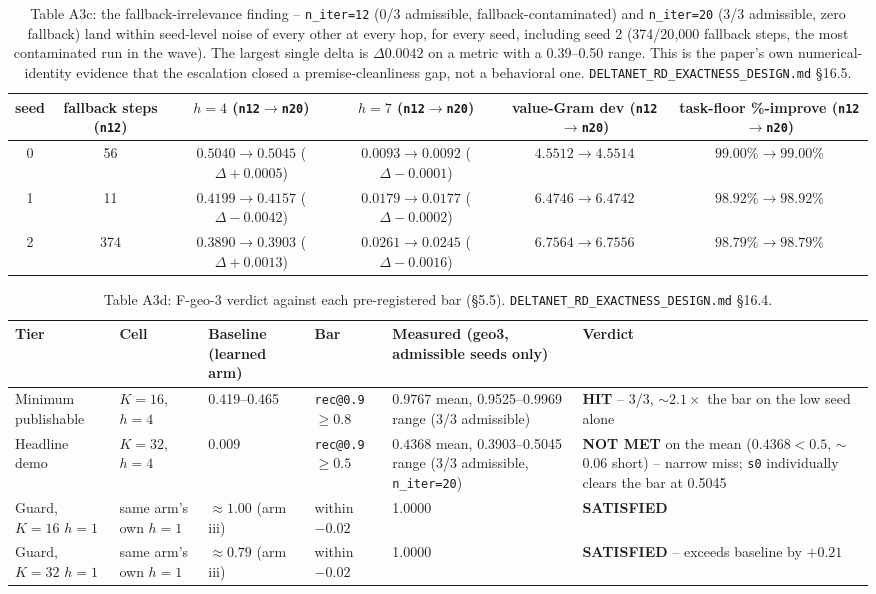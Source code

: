 \begin{table}[htbp]
\centering
\small
\begin{tabular}{cccccc}
\toprule
seed & fallback steps (\texttt{n12}) & $h{=}4$ (\texttt{n12}$\to$\texttt{n20}) & $h{=}7$ (\texttt{n12}$\to$\texttt{n20}) & value-Gram dev (\texttt{n12}$\to$\texttt{n20}) & task-floor \%-improve (\texttt{n12}$\to$\texttt{n20}) \\
\midrule
0 & 56  & $0.5040\to0.5045$ ($\Delta{+}0.0005$) & $0.0093\to0.0092$ ($\Delta{-}0.0001$) & $4.5512\to4.5514$ & $99.00\%\to99.00\%$ \\
1 & 11  & $0.4199\to0.4157$ ($\Delta{-}0.0042$) & $0.0179\to0.0177$ ($\Delta{-}0.0002$) & $6.4746\to6.4742$ & $98.92\%\to98.92\%$ \\
2 & 374 & $0.3890\to0.3903$ ($\Delta{+}0.0013$) & $0.0261\to0.0245$ ($\Delta{-}0.0016$) & $6.7564\to6.7556$ & $98.79\%\to98.79\%$ \\
\bottomrule
\end{tabular}
\caption{Table A3c: the fallback-irrelevance finding -- \texttt{n\_iter=12}
(0/3 admissible, fallback-contaminated) and \texttt{n\_iter=20} (3/3
admissible, zero fallback) land within seed-level noise of every other at
every hop, for every seed, including seed 2 (374/20{,}000 fallback steps,
the most contaminated run in the wave). The largest single delta is
$\Delta 0.0042$ on a metric with a 0.39--0.50 range. This is the paper's
own numerical-identity evidence that the escalation closed a
premise-cleanliness gap, not a behavioral one.
\texttt{DELTANET\_RD\_EXACTNESS\_DESIGN.md} \S16.5.}
\end{table}

\begin{table}[htbp]
\centering
\small
\begin{tabular}{p{2.6cm}p{2.0cm}p{1.6cm}p{1.6cm}p{3.6cm}p{3.6cm}}
\toprule
Tier & Cell & Baseline (learned arm) & Bar & Measured (geo3, admissible seeds only) & Verdict \\
\midrule
Minimum publishable & $K{=}16$, $h{=}4$ & 0.419--0.465 & \texttt{rec@0.9} $\geq 0.8$ & $0.9767$ mean, 0.9525--0.9969 range (3/3 admissible) & \textbf{HIT} -- 3/3, $\sim2.1\times$ the bar on the low seed alone \\
Headline demo & $K{=}32$, $h{=}4$ & 0.009 & \texttt{rec@0.9} $\geq 0.5$ & $0.4368$ mean, 0.3903--0.5045 range (3/3 admissible, \texttt{n\_iter=20}) & \textbf{NOT MET} on the mean ($0.4368 < 0.5$, $\sim$0.06 short) -- narrow miss; \texttt{s0} individually clears the bar at 0.5045 \\
Guard, $K{=}16$ $h{=}1$ & same arm's own $h{=}1$ & $\approx 1.00$ (arm iii) & within $-0.02$ & 1.0000 & \textbf{SATISFIED} \\
Guard, $K{=}32$ $h{=}1$ & same arm's own $h{=}1$ & $\approx 0.79$ (arm iii) & within $-0.02$ & 1.0000 & \textbf{SATISFIED} -- exceeds baseline by $+0.21$ \\
\bottomrule
\end{tabular}
\caption{Table A3d: F-geo-3 verdict against each pre-registered bar
(\S5.5). \texttt{DELTANET\_RD\_EXACTNESS\_DESIGN.md} \S16.4.}
\end{table}

